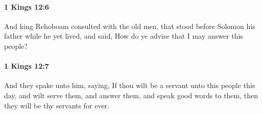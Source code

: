 		\paragraph{1 Kings 12:6} %
			\label{1KINGS-12-6}

			And king Rehoboam consulted with the old men, that stood before Solomon his father while he yet lived, and said, How do ye advise that I may answer this people?


		\paragraph{1 Kings 12:7} %
			\label{1KINGS-12-7}

			And they spake unto him, saying, If thou wilt be a servant unto this people this day, and wilt serve them, and answer them, and speak good words to them, then they will be thy servants for ever.


